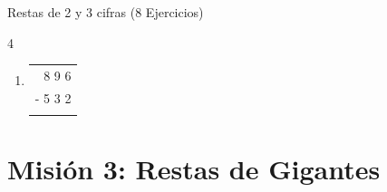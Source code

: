 \documentclass[12pt, letterpaper]{article}
\newcommand{\boxfill}[1][1.2cm]{\tcbox[on line, size=minimal, colframe=valdark!80, colback=white, boxrule=0.5pt, arc=1mm, boxsep=2pt, left=2pt, right=2pt, top=2pt, bottom=2pt]{\makebox[#1]{\vphantom{M}}}}
\begin{document}
\begin{practica}{Restas de 2 y 3 cifras (8 Ejercicios)}
\begin{multicols}{4}
\begin{enumerate}[itemsep=1cm]
				\item 
				\begin{tabular}{r}
					8 9 6 \\
					- 5 3 2 \\
					\hline
					\boxfill[1.5cm]
				\end{tabular}
			\end{enumerate}
		\end{multicols}
		\vspace{0.2cm}
	\end{practica}
	
	
	
	\section*{Misión 3: Restas de Gigantes}
	
\end{document}
